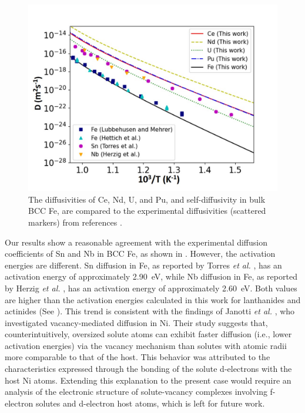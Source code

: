 \documentclass[preprint,12pt]{elsarticle}
\begin{document}
\begin{figure}[!ht]
    \centering
    \includegraphics[width=0.8\linewidth]{experiments_fe.jpg}
    \caption{The diffusivities of Ce, Nd, U, and Pu, and self-diffusivity in bulk BCC Fe, are compared to the experimental diffusivities (scattered markers) from references \cite{lubbehusen1990self,hettich1977self,torres2000diffusion,herzig2002niobium}.}
    \label{fig:diffusivities_exp}
\end{figure}

Our results show a reasonable agreement with the experimental diffusion coefficients of Sn and Nb in BCC Fe, as shown in . However, the activation energies are different. Sn diffusion in Fe, as reported by Torres \textit{et al.} \cite{torres2000diffusion}, has an activation energy of approximately 2.90~eV, while Nb diffusion in Fe, as reported by Herzig \textit{et al.} \cite{herzig2002niobium}, has an activation energy of approximately 2.60~eV. Both values are higher than the activation energies calculated in this work for lanthanides and actinides (See ). This trend is consistent with the findings of Janotti \textit{et al.} \cite{janotti2004solute}, who investigated vacancy-mediated diffusion in Ni. Their study suggests that, counterintuitively, oversized solute atoms can exhibit faster diffusion (i.e., lower activation energies) via the vacancy mechanism than solutes with atomic radii more comparable to that of the host. This behavior was attributed to the characteristics expressed through the bonding of the solute d-electrons with the host Ni atoms. Extending this explanation to the present case would require an analysis of the electronic structure of solute-vacancy complexes involving f-electron solutes and d-electron host atoms, which is left for future work.
\end{document}
